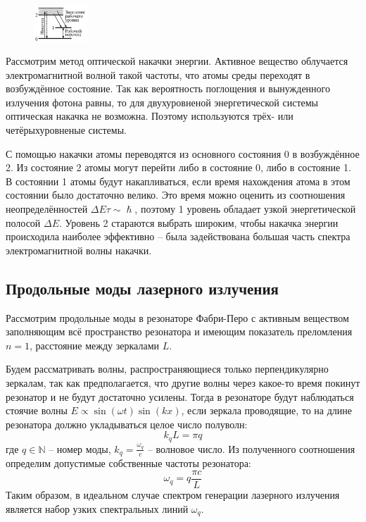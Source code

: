 \begin{figure}
	\centering
	\includegraphics[width=0.18\textwidth]{../Изображения/Накачка.png}
\end{figure}

Рассмотрим метод оптической накачки энергии. Активное вещество облучается 
электромагнитной волной такой частоты, что атомы среды переходят в возбуждённое 
состояние. Так как вероятность поглощения и вынужденного излучения фотона 
равны, то для двухуровненой энергетической системы оптическая накачка не 
возможна. Поэтому используются трёх- или четёрыхуровненые системы.

С помощью накачки атомы переводятся из основного состояния 0 в возбуждённое 2. 
Из состояние 2 атомы могут перейти либо в состояние 0, либо в состояние 1. В 
состоянии 1 атомы будут накапливаться, если время нахождения атома в этом 
состоянии было достаточно велико. Это время можно оценить из соотношения 
неопределённостей $\Delta E \tau \sim \hslash$, поэтому 1 уровень обладает 
узкой энергетической полосой $\Delta E$. Уровень 2 стараются выбрать широким, 
чтобы накачка энергии происходила наиболее эффективно -- была задействована 
большая часть спектра электромагнитной волны накачки.

\subsection*{Продольные моды лазерного излучения}

Рассмотрим продольные моды в резонаторе Фабри-Перо с активным веществом 
заполняющим всё пространство резонатора и имеющим показатель преломления $n = 
1$, расстояние между зеркалами $L$.

Будем рассматривать волны, распространяющиеся только перпендикулярно зеркалам, так как предполагается, что другие волны через  какое-то время покинут резонатор и не будут достаточно усилены. Тогда в 
резонаторе будут наблюдаться стоячие волны $E \propto \sin(\omega t) \sin 
(kx)$, если зеркала проводящие, то на длине резонатора должно укладываться 
целое число полуволн:
$$
k_q L = \pi q
$$
где $q \in \mathbb{N}$ -- номер моды, $k_q = \frac{\omega_q}{c}$ -- волновое 
число. Из полученного соотношения определим допустимые собственные частоты 
резонатора:
$$
\omega_q = q \frac{\pi c}{L}
$$
Таким образом, в идеальном случае спектром генерации лазерного излучения является набор узких спектральных линий $\omega_q$.

